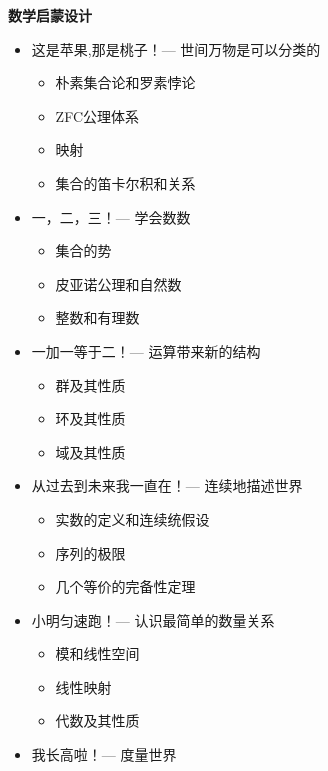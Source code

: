 \documentclass[lang=cn]{zlatex}
\begin{document}
\thispagestyle{empty}
\begin{center}
    {\bfseries 数学启蒙设计}
\end{center}

\begin{itemize}
    \item 这是苹果,那是桃子！--- 世间万物是可以分类的
        \begin{itemize}
            \item 朴素集合论和罗素悖论
            \item ZFC公理体系
            \item 映射
            \item 集合的笛卡尔积和关系
        \end{itemize}
    \item 一，二，三！--- 学会数数
        \begin{itemize}
            \item 集合的势
            \item 皮亚诺公理和自然数
            \item 整数和有理数
        \end{itemize}
    \item 一加一等于二！--- 运算带来新的结构
        \begin{itemize}
            \item 群及其性质
            \item 环及其性质
            \item 域及其性质
        \end{itemize}
    \item 从过去到未来我一直在！--- 连续地描述世界
        \begin{itemize}
            \item 实数的定义和连续统假设
            \item 序列的极限
            \item 几个等价的完备性定理
        \end{itemize}
    \item 小明匀速跑！--- 认识最简单的数量关系
        \begin{itemize}
            \item 模和线性空间
            \item 线性映射
            \item 代数及其性质
        \end{itemize}
    \item 我长高啦！--- 度量世界
        \begin{itemize}

\end{itemize}
\end{itemize}
\end{document}
